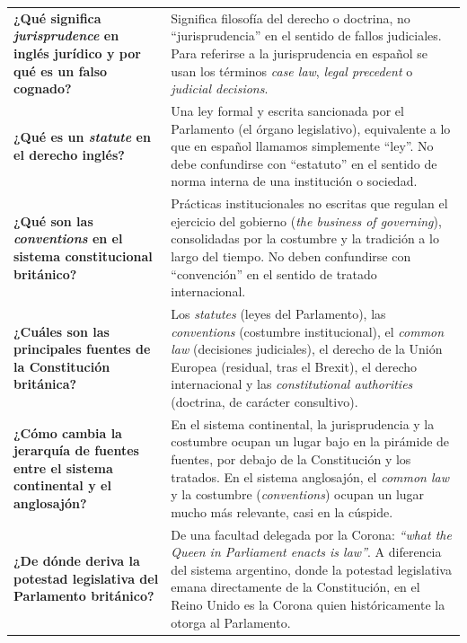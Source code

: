 \documentclass[12pt,oneside]{book}
\begin{document}
\begin{longtable}{
    >{\raggedright\arraybackslash}p{}
    >{\raggedright\arraybackslash}p{}
}
\textbf{¿Qué significa \emph{jurisprudence} en inglés jurídico y por qué es un falso cognado?} &
Significa filosofía del derecho o doctrina, no ``jurisprudencia'' en el sentido de fallos judiciales. Para referirse a la jurisprudencia en español se usan los términos \emph{case law}, \emph{legal precedent} o \emph{judicial decisions}. \\

\textbf{¿Qué es un \emph{statute} en el derecho inglés?} &
Una ley formal y escrita sancionada por el Parlamento (el órgano legislativo), equivalente a lo que en español llamamos simplemente ``ley''. No debe confundirse con ``estatuto'' en el sentido de norma interna de una institución o sociedad. \\

\textbf{¿Qué son las \emph{conventions} en el sistema constitucional británico?} &
Prácticas institucionales no escritas que regulan el ejercicio del gobierno (\emph{the business of governing}), consolidadas por la costumbre y la tradición a lo largo del tiempo. No deben confundirse con ``convención'' en el sentido de tratado internacional. \\

\textbf{¿Cuáles son las principales fuentes de la Constitución británica?} &
Los \emph{statutes} (leyes del Parlamento), las \emph{conventions} (costumbre institucional), el \emph{common law} (decisiones judiciales), el derecho de la Unión Europea (residual, tras el Brexit), el derecho internacional y las \emph{constitutional authorities} (doctrina, de carácter consultivo). \\

\textbf{¿Cómo cambia la jerarquía de fuentes entre el sistema continental y el anglosajón?} &
En el sistema continental, la jurisprudencia y la costumbre ocupan un lugar bajo en la pirámide de fuentes, por debajo de la Constitución y los tratados. En el sistema anglosajón, el \emph{common law} y la costumbre (\emph{conventions}) ocupan un lugar mucho más relevante, casi en la cúspide. \\

\textbf{¿De dónde deriva la potestad legislativa del Parlamento británico?} &
De una facultad delegada por la Corona: \emph{``what the Queen in Parliament enacts is law''}. A diferencia del sistema argentino, donde la potestad legislativa emana directamente de la Constitución, en el Reino Unido es la Corona quien históricamente la otorga al Parlamento. \\


\end{longtable}
\end{document}
